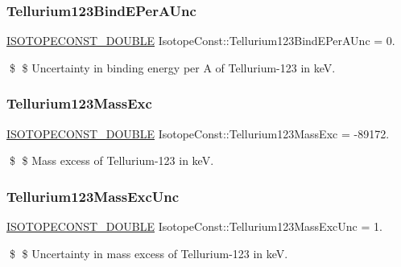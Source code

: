 \subsubsection{\texorpdfstring{Tellurium123\+Bind\+E\+Per\+A\+Unc}{Tellurium123BindEPerAUnc}}
{\footnotesize\ttfamily \mbox{\hyperlink{group___isotope_const-_macros_ga8f45a7272ce02c0b4c65c44636ed719a}{I\+S\+O\+T\+O\+P\+E\+C\+O\+N\+S\+T\+\_\+\+D\+O\+U\+B\+LE}} Isotope\+Const\+::\+Tellurium123\+Bind\+E\+Per\+A\+Unc = 0.}

\$ \$ Uncertainty in binding energy per A of Tellurium-\/123 in keV. \mbox{\label{group___isotope_const-_tellurium-_te123_ga9cd9f5c246a6f1d088aaf169498bd81a}} 
\subsubsection{\texorpdfstring{Tellurium123\+Mass\+Exc}{Tellurium123MassExc}}
{\footnotesize\ttfamily \mbox{\hyperlink{group___isotope_const-_macros_ga8f45a7272ce02c0b4c65c44636ed719a}{I\+S\+O\+T\+O\+P\+E\+C\+O\+N\+S\+T\+\_\+\+D\+O\+U\+B\+LE}} Isotope\+Const\+::\+Tellurium123\+Mass\+Exc = -\/89172.}

\$ \$ Mass excess of Tellurium-\/123 in keV. \mbox{\label{group___isotope_const-_tellurium-_te123_ga1f7a28f3f430bbd516491103b5a89dc7}} 
\subsubsection{\texorpdfstring{Tellurium123\+Mass\+Exc\+Unc}{Tellurium123MassExcUnc}}
{\footnotesize\ttfamily \mbox{\hyperlink{group___isotope_const-_macros_ga8f45a7272ce02c0b4c65c44636ed719a}{I\+S\+O\+T\+O\+P\+E\+C\+O\+N\+S\+T\+\_\+\+D\+O\+U\+B\+LE}} Isotope\+Const\+::\+Tellurium123\+Mass\+Exc\+Unc = 1.}

\$ \$ Uncertainty in mass excess of Tellurium-\/123 in keV. \mbox{\label{group___isotope_const-_tellurium-_te123_ga73a505544bc97fa057e72bb3aa0cce11}} 
